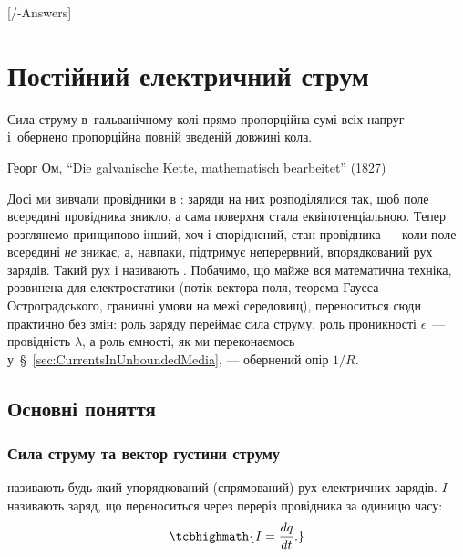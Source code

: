 
[\currfilebase/\currfilebase-Answers]
\chapter{Постійний електричний струм}\label{\currfilebase}\hypertarget{SteadyCurrent}{}
\graphicspath{{\currfilebase/Pictures}}
\epigraph{\Alexander Сила струму в~гальванічному колі прямо пропорційна сумі всіх напруг і~обернено
	пропорційна повній зведеній довжині кола.}{Георг Ом, \enquote{Die galvanische Kette, mathematisch
	bearbeitet} (1827)}


Досі ми вивчали провідники в : заряди на них розподілялися так, щоб поле всередині провідника зникло, а сама поверхня стала еквіпотенціальною. Тепер розглянемо принципово інший, хоч і споріднений, стан провідника --- коли поле всередині \emph{не} зникає, а, навпаки, підтримує неперервний, впорядкований рух зарядів. Такий рух і називають . Побачимо, що майже вся математична техніка, розвинена для електростатики (потік вектора поля, теорема Гаусса--Остроградського, граничні умови на межі середовищ), переноситься сюди практично без змін: роль заряду переймає сила струму, роль проникності $\epsilon$~--- провідність $\lambda$, а роль ємності, як ми переконаємось у~\S~\ref{sec:CurrentsInUnboundedMedia}, --- обернений опір $1/R$.

\section{Основні поняття}\hypertarget{current-basic-concepts}{}

\subsection*{Сила струму та вектор густини струму}

 називають будь-який упорядкований (спрямований) рух електричних зарядів.  $I$ називають заряд, що
переноситься через переріз провідника за одиницю часу:
\begin{equation}\label{eq:CurrentDef}
	\tcbhighmath{
		I = \frac{dq}{dt}.
	}
\end{equation}

